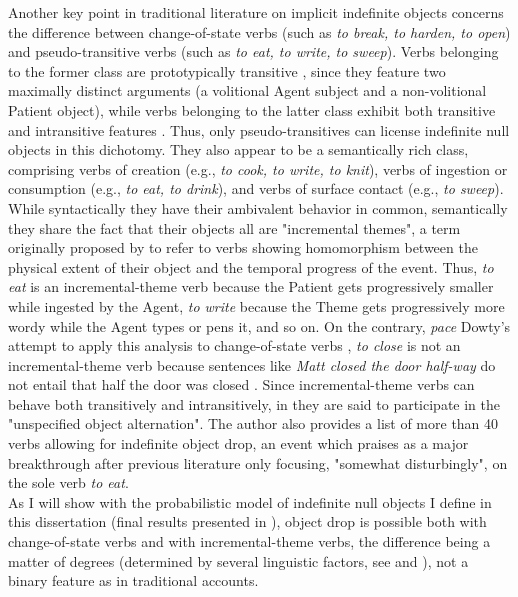 Another key point in traditional literature on implicit indefinite objects concerns the difference between change-of-state verbs (such as \textit{to break, to harden, to open}) and pseudo-transitive verbs (such as \textit{to eat, to write, to sweep}). Verbs belonging to the former class are prototypically transitive \parencite{HopperThompson1980, Kardos2010, lemmens2006}, since they feature two maximally distinct arguments (a volitional Agent subject and a non-volitional Patient object), while verbs belonging to the latter class exhibit both transitive and intransitive features \parencite{Armstrong2011}. Thus, only pseudo-transitives can license indefinite null objects in this dichotomy. They also appear to be a semantically rich class, comprising verbs of creation (e.g., \textit{to cook, to write, to knit}), verbs of ingestion or consumption (e.g., \textit{to eat, to drink}), and verbs of surface contact (e.g., \textit{to sweep}). While syntactically they have their ambivalent behavior in common, semantically they share the fact that their objects all are "incremental themes", a term originally proposed by \textcite{dowty1991thematic} to refer to verbs showing homomorphism between the physical extent of their object and the temporal progress of the event. Thus, \textit{to eat} is an incremental-theme verb because the Patient gets progressively smaller while ingested by the Agent, \textit{to write} because the Theme gets progressively more wordy while the Agent types or pens it, and so on. On the contrary, \textit{pace} Dowty's attempt to apply this analysis to change-of-state verbs \parencite[568]{dowty1991thematic}, \textit{to close} is not an incremental-theme verb because sentences like \textit{Matt closed the door half-way} do not entail that half the door was closed \parencite[279]{RappaportHovavLevin2005}. Since incremental-theme verbs can behave both transitively and intransitively, in \textcite[33]{Levin1993} they are said to participate in the "unspecified object alternation". The author also provides a list of more than 40 verbs allowing for indefinite object drop, an event which \textcite[116]{Dvorak2017} praises as a major breakthrough after previous literature only focusing, "somewhat disturbingly", on the sole verb \textit{to eat}.\\
As I will show with the probabilistic model of indefinite null objects I define in this dissertation (final results presented in ), object drop is possible both with change-of-state verbs and with incremental-theme verbs, the difference being a matter of degrees (determined by several linguistic factors, see  and ), not a binary feature as in traditional accounts.


